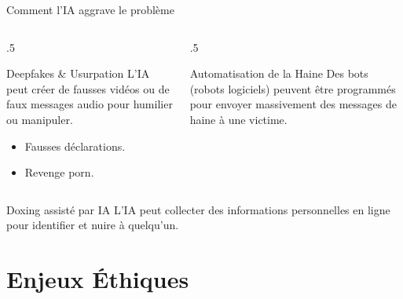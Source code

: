 \documentclass[10pt, aspectratio=169]{beamer}
\begin{document}
\begin{frame}{Comment l'IA aggrave le problème}
  
  \begin{columns}[T]
    \begin{column}{.5\textwidth}
      \begin{block}{Deepfakes \& Usurpation}
        L'IA peut créer de fausses vidéos ou de faux messages audio pour humilier ou manipuler.
        \begin{itemize}
          \item Fausses déclarations.
          \item Revenge porn.
        \end{itemize}
      \end{block}
    \end{column}
    \begin{column}{.5\textwidth}
      \begin{alertblock}{Automatisation de la Haine}
        Des bots (robots logiciels) peuvent être programmés pour envoyer massivement des messages de haine à une victime.
      \end{alertblock}
    \end{column}
  \end{columns}

  \begin{block}{Doxing assisté par IA}
    L'IA peut collecter des informations personnelles en ligne pour identifier et nuire à quelqu'un.
  \end{block}
\end{frame}

\section{Enjeux Éthiques}
\end{document}
